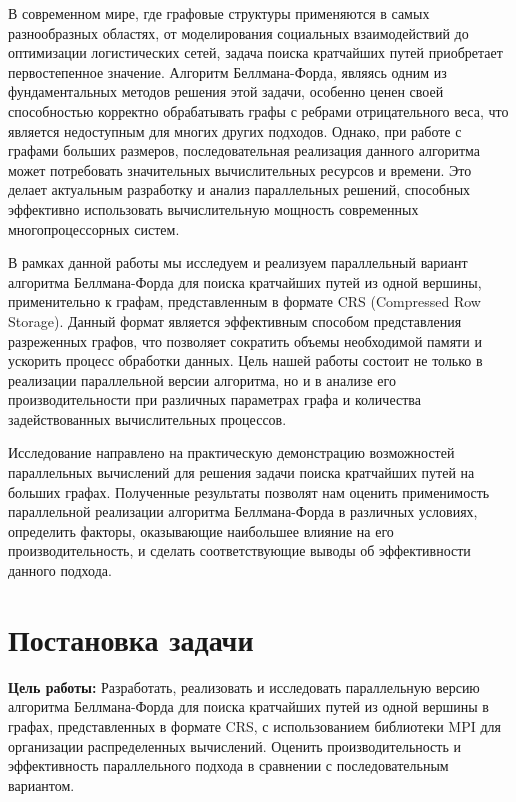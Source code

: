 \documentclass[a4paper, 14pt]{article}
\begin{document}
	\indent В современном мире, где графовые структуры применяются в самых разнообразных областях, от моделирования социальных взаимодействий до оптимизации логистических сетей, задача поиска кратчайших путей приобретает первостепенное значение. Алгоритм Беллмана-Форда, являясь одним из фундаментальных методов решения этой задачи, особенно ценен своей способностью корректно обрабатывать графы с ребрами отрицательного веса, что является недоступным для многих других подходов.  Однако, при работе с графами больших размеров, последовательная реализация данного алгоритма может потребовать значительных вычислительных ресурсов и времени. Это делает актуальным разработку и анализ параллельных решений, способных эффективно использовать вычислительную мощность современных многопроцессорных систем.
\par В рамках данной работы мы исследуем и реализуем параллельный вариант алгоритма Беллмана-Форда для поиска кратчайших путей из одной вершины,  применительно к графам, представленным в формате CRS (Compressed Row Storage). Данный формат является эффективным способом представления разреженных графов, что позволяет сократить объемы необходимой памяти и ускорить процесс обработки данных.  Цель нашей работы состоит не только в реализации параллельной версии алгоритма, но и в анализе его производительности при различных параметрах графа и количества задействованных вычислительных процессов.
\par  Исследование направлено на практическую демонстрацию возможностей параллельных вычислений для решения задачи поиска кратчайших путей на больших графах. Полученные результаты позволят нам оценить применимость параллельной реализации алгоритма Беллмана-Форда в различных условиях, определить факторы, оказывающие наибольшее влияние на его производительность, и сделать соответствующие выводы об эффективности данного подхода.

	
	
	\newpage
	\section*{\centering Постановка задачи}
	\textbf{Цель работы:} Разработать, реализовать и исследовать параллельную версию алгоритма Беллмана-Форда для поиска кратчайших путей из одной вершины в графах, представленных в формате CRS, с использованием библиотеки MPI для организации распределенных вычислений. Оценить производительность и эффективность параллельного подхода в сравнении с последовательным вариантом.
\end{document}
